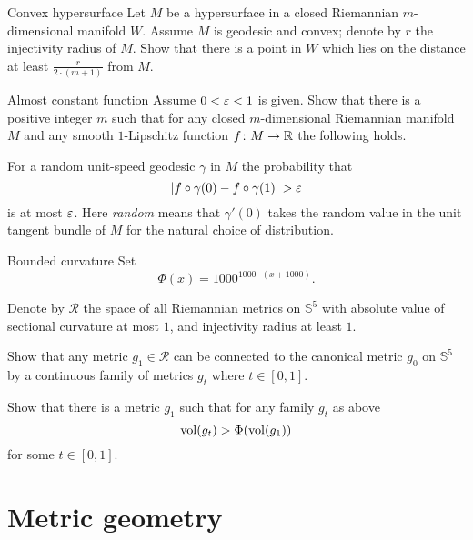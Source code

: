\documentclass[twoside]{book}
\begin{document}
\begin{pr}{}{Convex hypersurface}\label{Convex hypersurface}
Let $M$ be a hypersurface 
in a closed Riemannian $m$-dimensional manifold $W$.
Assume $M$ is geodesic and convex;
denote by $r$ the injectivity radius of $M$.
Show that there is a point in $W$  which lies on the distance at least  
$\frac{r}{2\cdot(m+1)}$ from $M$.
\end{pr}

\begin{pr}{}{Almost constant function}\label{Almost constant function}
Assume $0<\varepsilon<1$ is given.
Show that there is a positive integer $m$ such that
for any closed $m$-dimensional Riemannian manifold $M$
and any smooth $1$-Lipschitz function $f\:M\z\to\RR$ the following holds.

For a random unit-speed geodesic $\gamma$ in $M$ 
the probability that 
\[|f\circ\gamma(0)-f\circ\gamma(1)|>\eps\]
is at most $\varepsilon$.
Here \emph{random} means that $\gamma'(0)$ takes the random value in the unit tangent bundle of $M$ for the natural choice of distribution.
\end{pr}

\begin{pr}{\thm}{Bounded curvature}\label{Bounded curvature}
Set 
\[\Phi(x)=1000^{1000\cdot (x+1000)}.\]

Denote by $\mathcal{R}$ the space of 
all Riemannian metrics on $\mathbb S^5$
with absolute value of sectional curvature at most $1$,
and injectivity radius at least $1$.

Show that any metric $g_1\in \mathcal{R}$ 
can be connected to the canonical metric $g_0$ on $\mathbb S^5$
by a continuous family of metrics $g_t$ where $t\in[0,1]$.

Show that there is a metric $g_1$ 
such that 
for any family $g_t$ as above
\[\operatorname{\rm vol}(g_t)>\Phi(\operatorname{\rm vol}(g_1))\]
for some $t\in [0,1]$.
\end{pr}






\chapter{Metric geometry}

\end{document}
